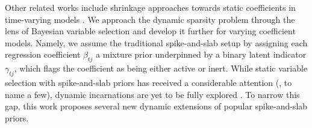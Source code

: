 \documentclass[ba]{imsart}
\numberwithin{equation}{section}
\theoremstyle{plain}
\begin{document}
 Other related works include shrinkage approaches towards static coefficients in time-varying models  \citep{fruhwirth_wagner, bitto,lopes_mcc_tsay}. We approach the dynamic sparsity problem through the {lens of}  Bayesian variable selection  and develop it  further for varying coefficient models. Namely, we assume the traditional spike-and-slab setup  by assigning  each regression coefficient $\beta_{tj}$ a mixture prior underpinned by a binary latent indicator $\gamma_{tj}$, which flags {the coefficient} as being either active or inert.  While static variable selection with spike-and-slab priors 
  has received a considerable attention (\cite{carlin_chib, Clyde, GM93,GM97,mitchell_beauchamp,RG14}, to name a few), dynamic incarnations are yet to be fully explored \citep{george_sun,fruhwirth_wagner, nakajima_west,groen}. 
  To narrow this gap, this work proposes several new dynamic extensions of popular  spike-and-slab priors.
\end{document}
